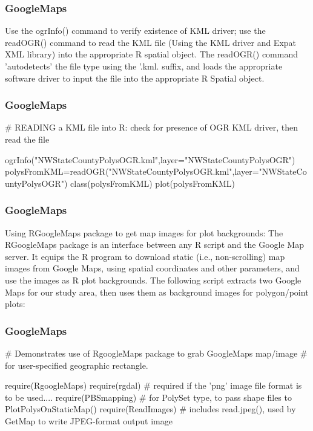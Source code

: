 \documentclass{beamer}
\begin{document}
\begin{frame}[fragile]
\frametitle{GoogleMaps}
Use the ogrInfo() command to verify existence of KML driver; use the readOGR() command to read the KML file (Using the KML driver and Expat XML library) into the appropriate R spatial object. The readOGR() command 'autodetects' the file type using the '.kml. suffix, and loads the appropriate software driver to input the file into the appropriate R Spatial object.

\end{frame}
\begin{frame}[fragile]
\frametitle{GoogleMaps}

# READING a KML file into R: check for presence of OGR KML driver, then read the file

ogrInfo("NWStateCountyPolysOGR.kml",layer="NWStateCountyPolysOGR")
polysFromKML=readOGR("NWStateCountyPolysOGR.kml",layer="NWStateCountyPolysOGR") class(polysFromKML)
plot(polysFromKML) 
\end{frame}
\begin{frame}[fragile]
\frametitle{GoogleMaps}

Using RGoogleMaps package to get map images for plot backgrounds:
The RGoogleMaps package is an interface between any R script and the Google Map server. It equips the R program to download static (i.e., non-scrolling) map images from Google Maps, using spatial coordinates and other parameters, and use the images as R plot backgrounds. The following script extracts two Google Maps for our study area, then uses them as background images for polygon/point plots:

\end{frame}
\begin{frame}[fragile]
\frametitle{GoogleMaps}



# Demonstrates use of RgoogleMaps package to grab GoogleMaps map/image
# for user-specified geographic rectangle.

   require(RgoogleMaps)
   require(rgdal)      # required if the 'png' image file format is to be used....
   require(PBSmapping) # for PolySet type, to  pass shape files to  PlotPolysOnStaticMap()
   require(ReadImages) # includes read.jpeg(), used by GetMap to write JPEG-format output image
\end{frame}
\end{document}
